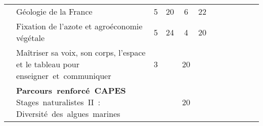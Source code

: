 \begin{tabular}{c|m{4.5cm}|cm{0.75cm}|cm{0.75cm}|cm{0.75cm}|cm{0.75cm}|cm{0.75cm}|}
 & \color{black} Géologie de la France & \color{black} 5 & \color{black} 20 & \color{black} 6 &  \color{black} 22 \\ \cline{2-6}

 & \cellcolor{couleurClaire} \color{couleurTexte} Fixation de l'azote et agroéconomie végétale & \cellcolor{couleurClaire} \color{couleurTexte} 5 & \cellcolor{couleurClaire} \color{couleurTexte} 24 & \cellcolor{couleurClaire} \color{couleurTexte} 4 & \cellcolor{couleurClaire} \color{couleurTexte} 20 \\ \cline{2-6}

 & \color{black} Maîtriser sa voix, son corps, l’espace et le tableau pour \mbox{enseigner et communiquer} & \color{black} 3 & \color{black} & \color{black} 20 &  \color{black} \\ \cline{1-6}


 & \cellcolor{couleurClaire} \color{couleurTexte} \mbox{\textbf{Parcours renforcé CAPES}} \mbox{Stages naturalistes II :} \mbox{Diversité des algues marines}  & \cellcolor{couleurClaire} \color{couleurTexte} & \cellcolor{couleurClaire} \color{couleurTexte}  & \cellcolor{couleurClaire} \color{couleurTexte} 20 & \cellcolor{couleurClaire} \color{couleurTexte} \\ \cline{1-6}




\end{tabular}

